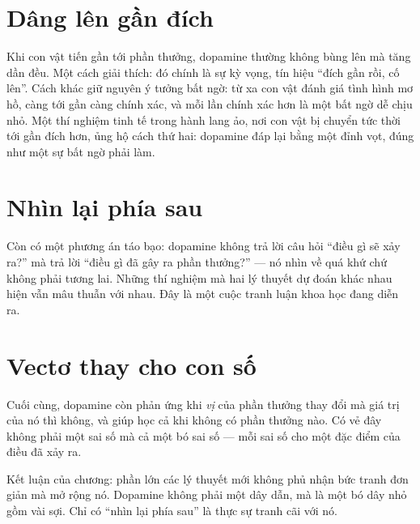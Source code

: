 \section*{Dâng lên gần đích}

Khi con vật tiến gần tới phần thưởng, dopamine thường không bùng lên mà tăng dần đều. Một cách giải thích: đó chính là sự kỳ vọng, tín hiệu ``đích gần rồi, cố lên''. Cách khác giữ nguyên ý tưởng bất ngờ: từ xa con vật đánh giá tình hình mơ hồ, càng tới gần càng chính xác, và mỗi lần chính xác hơn là một bất ngờ dễ chịu nhỏ. Một thí nghiệm tinh tế trong hành lang ảo, nơi con vật bị chuyển tức thời tới gần đích hơn, ủng hộ cách thứ hai: dopamine đáp lại bằng một đỉnh vọt, đúng như một sự bất ngờ phải làm.

\section*{Nhìn lại phía sau}

Còn có một phương án táo bạo: dopamine không trả lời câu hỏi ``điều gì sẽ xảy ra?'' mà trả lời ``điều gì đã gây ra phần thưởng?'' --- nó nhìn về quá khứ chứ không phải tương lai. Những thí nghiệm mà hai lý thuyết dự đoán khác nhau hiện vẫn mâu thuẫn với nhau. Đây là một cuộc tranh luận khoa học đang diễn ra.

\section*{Vectơ thay cho con số}

Cuối cùng, dopamine còn phản ứng khi \emph{vị} của phần thưởng thay đổi mà giá trị của nó thì không, và giúp học cả khi không có phần thưởng nào. Có vẻ đây không phải một sai số mà cả một bó sai số --- mỗi sai số cho một đặc điểm của điều đã xảy ra.

Kết luận của chương: phần lớn các lý thuyết mới không phủ nhận bức tranh đơn giản mà mở rộng nó. Dopamine không phải một dây dẫn, mà là một bó dây nhỏ gồm vài sợi. Chỉ có ``nhìn lại phía sau'' là thực sự tranh cãi với nó.

